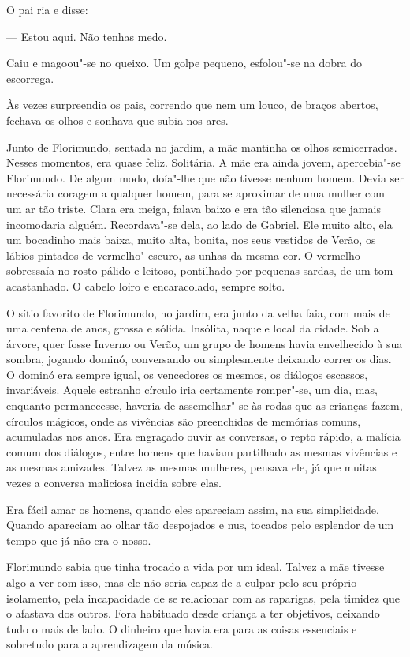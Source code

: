 O pai ria e disse:

--- Estou aqui. Não tenhas medo.

Caiu e magoou"-se no queixo. Um golpe pequeno, esfolou"-se na dobra do
escorrega.

Às vezes surpreendia os pais, correndo que nem um louco, de braços
abertos, fechava os olhos e sonhava que subia nos ares.

Junto de Florimundo, sentada no jardim, a mãe mantinha os olhos
semicerrados. Nesses momentos, era quase feliz. Solitária. A mãe era
ainda jovem, apercebia"-se Florimundo. De algum modo, doía"-lhe que não
tivesse nenhum homem. Devia ser necessária coragem a qualquer homem,
para se aproximar de uma mulher com um ar tão triste. Clara era meiga,
falava baixo e era tão silenciosa que jamais incomodaria alguém.
Recordava"-se dela, ao lado de Gabriel. Ele muito alto, ela um bocadinho
mais baixa, muito alta, bonita, nos seus vestidos de Verão, os lábios
pintados de vermelho"-escuro, as unhas da mesma cor. O vermelho
sobressaía no rosto pálido e leitoso, pontilhado por pequenas sardas, de
um tom acastanhado. O cabelo loiro e encaracolado, sempre solto.

O sítio favorito de Florimundo, no jardim, era junto da velha faia, com
mais de uma centena de anos, grossa e sólida. Insólita, naquele local da
cidade. Sob a árvore, quer fosse Inverno ou Verão, um grupo de homens
havia envelhecido à sua sombra, jogando dominó, conversando ou
simplesmente deixando correr os dias. O dominó era sempre igual, os
vencedores os mesmos, os diálogos escassos, invariáveis. Aquele estranho
círculo iria certamente romper"-se, um dia, mas, enquanto permanecesse,
haveria de assemelhar"-se às rodas que as crianças fazem, círculos
mágicos, onde as vivências são preenchidas de memórias comuns,
acumuladas nos anos. Era engraçado ouvir as conversas, o repto rápido, a
malícia comum dos diálogos, entre homens que haviam partilhado as mesmas
vivências e as mesmas amizades. Talvez as mesmas mulheres, pensava ele,
já que muitas vezes a conversa maliciosa incidia sobre elas.

Era fácil amar os homens, quando eles apareciam assim, na sua
simplicidade. Quando apareciam ao olhar tão despojados e nus, tocados
pelo esplendor de um tempo que já não era o nosso.

Florimundo sabia que tinha trocado a vida por um ideal. Talvez a mãe
tivesse algo a ver com isso, mas ele não seria capaz de a culpar pelo
seu próprio isolamento, pela incapacidade de se relacionar com as
raparigas, pela timidez que o afastava dos outros. Fora habituado desde
criança a ter objetivos, deixando tudo o mais de lado. O dinheiro que
havia era para as coisas essenciais e sobretudo para a aprendizagem da
música.

